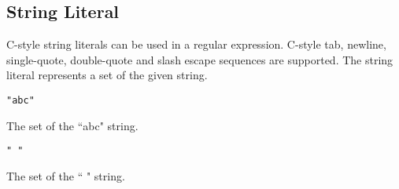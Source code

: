 
\subsection{String Literal}
{
	C-style string literals can be used in a regular expression.
	C-style tab, newline, single-quote, double-quote and slash escape sequences
	are supported.
	The string literal represents a set of the given string.
	
	\begin{itemize}
	{
		\item[] \texttt{"abc"}
		
			The set of the ``abc" string.
		
		\item[] \texttt{" "}
		
			The set of the `` " string.
	}
	\end{itemize}
}

